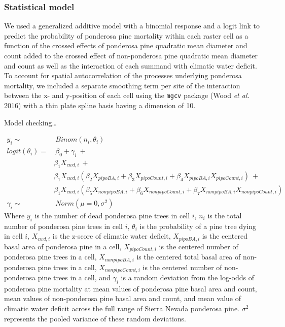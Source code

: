 \documentclass[]{article}
\begin{document}
\subsubsection{Statistical model}\label{statistical-model}

We used a generalized additive model with a binomial response and a
logit link to predict the probability of ponderosa pine mortality within
each raster cell as a function of the crossed effects of ponderosa pine
quadratic mean diameter and count added to the crossed effect of
non-ponderosa pine quadratic mean diameter and count as well as the
interaction of each summand with climatic water deficit. To account for
spatial autocorrelation of the processes underlying ponderosa mortality,
we included a separate smoothing term per site of the interaction
between the x- and y-position of each cell using the \texttt{mgcv}
package (Wood \emph{et al.} 2016) with a thin plate spline basis having
a dimension of 10.

Model checking\ldots{}

\[
\begin{aligned}
y_i \sim &\ Binom(n_i, \theta_i) \\
logit(\theta_i) = &\ \beta_0 + \gamma_i\ + \\
& \beta_1X_{cwd, i}\ + \\
& \beta_1X_{cwd, i}(\beta_2X_{pipoBA, i} + \beta_3X_{pipoCount, i} + \beta_4X_{pipoBA, i}X_{pipoCount, i})\ + \\ 
& \beta_1X_{cwd, i}(\beta_5X_{nonpipoBA, i} + \beta_6X_{nonpipoCount, i} + \beta_7X_{nonpipoBA, i}X_{nonpipoCount, i}) \\
\gamma_i \sim &\ Norm(\mu = 0, \sigma^2)
\end{aligned}
\] Where \(y_i\) is the number of dead ponderosa pine trees in cell
\(i\), \(n_i\) is the total number of ponderosa pine trees in cell
\(i\), \(\theta_i\) is the probability of a pine tree dying in cell
\(i\), \(X_{cwd, i}\) is the z-score of climatic water deficit,
\(X_{pipoBA, i}\) is the centered basal area of ponderosa pine in a
cell, \(X_{pipoCount, i}\) is the centered number of ponderosa pine
trees in a cell, \(X_{nonpipoBA, i}\) is the centered total basal area
of non-ponderosa pine trees in a cell, \(X_{nonpipoCount, i}\) is the
centered number of non-ponderosa pine trees in a cell, and \(\gamma_i\)
is a random deviation from the log-odds of ponderosa pine mortality at
mean values of ponderosa pine basal area and count, mean values of
non-ponderosa pine basal area and count, and mean value of climatic
water deficit across the full range of Sierra Nevada ponderosa pine.
\(\sigma^2\) represents the pooled variance of these random deviations.
\end{document}
